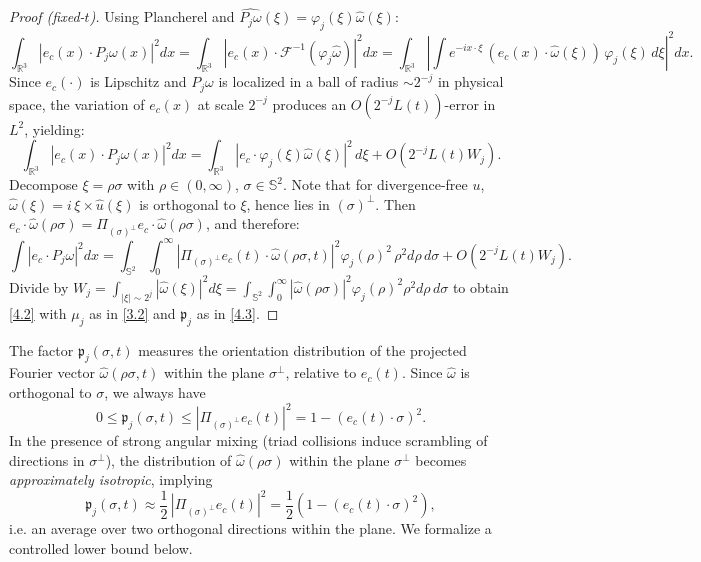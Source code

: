 \documentclass[11pt]{article}
\begin{document}
\begin{proof}[Proof (fixed-$t$)]
Using Plancherel and $\widehat{P_j \omega}(\xi) = \varphi_j(\xi) \widehat{\omega}(\xi)$:
\[
\int_{\mathbb{R}^3} |e_c(x) \cdot P_j \omega(x)|^2 dx 
= \int_{\mathbb{R}^3} |e_c(x) \cdot \mathcal{F}^{-1}(\varphi_j \widehat{\omega})|^2 dx 
= \int_{\mathbb{R}^3} \left| \int e^{-ix\cdot \xi} \, (e_c(x) \cdot \widehat{\omega}(\xi)) \, \varphi_j(\xi) \, d\xi \right|^2 dx.
\]
Since $e_c(\cdot)$ is Lipschitz and $P_j \omega$ is localized in a ball of radius $\sim 2^{-j}$ in physical space, the variation of $e_c(x)$ at scale $2^{-j}$ produces an $O(2^{-j} L(t))$-error in $L^2$, yielding:
\[
\int_{\mathbb{R}^3} |e_c(x) \cdot P_j \omega(x)|^2 dx 
= \int_{\mathbb{R}^3} |e_c \cdot \varphi_j(\xi) \widehat{\omega}(\xi)|^2 \, d\xi + O(2^{-j} L(t) W_j).
\]
Decompose $\xi = \rho \sigma$ with $\rho \in (0,\infty)$, $\sigma \in \mathbb{S}^2$. Note that for divergence-free $u$, $\widehat{\omega}(\xi) = i \, \xi \times \widehat{u}(\xi)$ is orthogonal to $\xi$, hence lies in $(\sigma)^\perp$. Then $e_c \cdot \widehat{\omega}(\rho \sigma) = \Pi_{(\sigma)^\perp} e_c \cdot \widehat{\omega}(\rho \sigma)$, and therefore:
\[
\int |e_c \cdot P_j \omega|^2 dx = \int_{\mathbb{S}^2} \int_0^\infty 
\left| \Pi_{(\sigma)^\perp} e_c(t) \cdot \widehat{\omega}(\rho\sigma, t) \right|^2 \varphi_j(\rho)^2 \, \rho^2 d\rho \, d\sigma + O(2^{-j} L(t) W_j).
\]
Divide by $W_j = \int_{|\xi|\sim 2^j} |\widehat{\omega}(\xi)|^2 d\xi = \int_{\mathbb{S}^2} \int_0^\infty |\widehat{\omega}(\rho\sigma)|^2 \varphi_j(\rho)^2 \rho^2 d\rho \, d\sigma$ to obtain \eqref{4.2} with $\mu_j$ as in \eqref{3.2} and $\mathfrak{p}_j$ as in \eqref{4.3}.
\end{proof}

\begin{remark}
The factor $\mathfrak{p}_j(\sigma, t)$ measures the orientation distribution of the projected Fourier vector $\widehat{\omega}(\rho \sigma, t)$ within the plane $\sigma^\perp$, relative to $e_c(t)$. Since $\widehat{\omega}$ is orthogonal to $\sigma$, we always have
\[
0 \leq \mathfrak{p}_j(\sigma,t) \leq |\Pi_{(\sigma)^\perp} e_c(t)|^2 = 1 - (e_c(t)\cdot \sigma)^2.
\]
In the presence of strong angular mixing (triad collisions induce scrambling of directions in $\sigma^\perp$), the distribution of $\widehat{\omega}(\rho \sigma)$ within the plane $\sigma^\perp$ becomes \emph{approximately isotropic}, implying
\[
\mathfrak{p}_j(\sigma, t) \approx \frac{1}{2} \, |\Pi_{(\sigma)^\perp} e_c(t)|^2 = \frac{1}{2} \left( 1 - (e_c(t)\cdot\sigma)^2 \right),
\]
i.e. an average over two orthogonal directions within the plane. We formalize a controlled lower bound below.
\end{remark}
\end{document}
